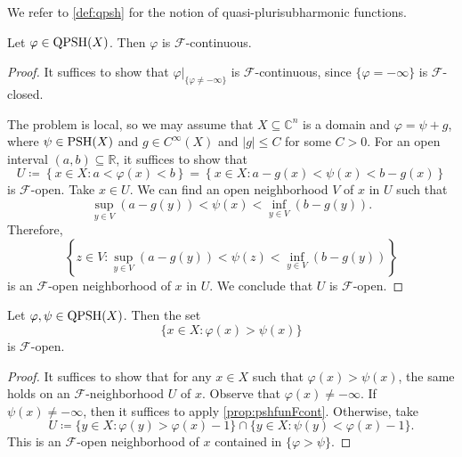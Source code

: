 We refer to \cref{def:qpsh} for the notion of quasi-plurisubharmonic functions.
\begin{proposition}\label{prop:pshfunFcont}
    Let $\varphi\in \mathrm{QPSH}(X)$. Then $\varphi$ is $\mathcal{F}$-continuous.
\end{proposition}
\begin{proof}
    It suffices to show that $\varphi|_{\{\varphi\neq -\infty\}}$ is $\mathcal{F}$-continuous, since $\{\varphi=-\infty\}$ is $\mathcal{F}$-closed.

    The problem is local, so we may assume that $X\subseteq \mathbb{C}^n$ is a domain and $\varphi=\psi+g$, where $\psi\in \mathrm{PSH}(X)$ and $g\in C^{\infty}(X)$ and $|g|\leq C$ for some $C>0$. For an open interval $(a,b)\subseteq \mathbb{R}$, it suffices to show that
    \[
        U\coloneqq \left\{ x\in X:a<\varphi(x)<b\right\}=\left\{ x\in X:a-g(x)<\psi(x)<b-g(x)\right\}
    \]
    is $\mathcal{F}$-open. Take $x\in U$. We can find an open neighborhood $V$ of $x$ in $U$ such that
    \[
    \sup_{y\in V} \left( a-g(y)\right)<\psi(x)< \inf_{y\in V} \left( b-g(y) \right).
    \]
    Therefore,
    \[
    \left\{z\in V:\sup_{y\in V} \left(a-g(y)\right)<\psi(z)<\inf_{y\in V} \left(b-g(y)\right)\right\}
    \]
    is an $\mathcal{F}$-open neighborhood of $x$ in $U$. We conclude that $U$ is $\mathcal{F}$-open.
\end{proof}

\begin{corollary}\label{cor:diffpshFopen}
    Let $\varphi,\psi\in \mathrm{QPSH}(X)$. Then the set
    \[
    \{x\in X: \varphi(x)>\psi(x)\}
    \]
    is $\mathcal{F}$-open.
\end{corollary}
\begin{proof}
    It suffices to show that for any $x\in X$ such that $\varphi(x)>\psi(x)$, the same holds on an $\mathcal{F}$-neighborhood $U$ of $x$. Observe that $\varphi(x)\neq -\infty$.
    If $\psi(x)\neq -\infty$, then it suffices to apply \cref{prop:pshfunFcont}. Otherwise, take
    \[
    U\coloneqq \{y\in X: \varphi(y)>\varphi(x)-1\}\cap \{y\in X: \psi(y)<\varphi(x)-1\}.
    \]
    This is an $\mathcal{F}$-open neighborhood of $x$ contained in $\{\varphi>\psi\}$.
\end{proof}

